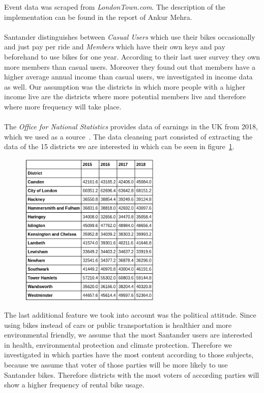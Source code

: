 Event data was scraped from \emph{LondonTown.com}\cite{LondonTown2019}. The description of the implementation can be found in the report of Ankur Mehra.\\\\
Santander distinguishes between \emph{Casual Users} which use their bikes occasionally and just pay per ride and \emph{Members} which have their own keys and pay beforehand to use bikes for one year. According to their last user survey they own more members than casual users. Moreover they found out that members have a higher average annual income than casual users, we investigated in income data as well. Our assumption was the districts in which more people with a higher income live are the districts where more potential members live and therefore where more frequency will take place.\\\\
The \emph{Office for National Statistics} provides data of earnings in the UK from 2018, which we used as a source~\cite{OfficeforNationalStatistics2019}. The data cleansing part consisted of extracting the data of the 15 districts we are interested in which can be seen in figure~\ref{fig:earnings}.
\begin{figure}[H]
\centering
\includegraphics[width=0.6\textwidth]{img/earnings}\label{fig:earnings}
\label{fig:earnings}
\end{figure}
The last additional feature we took into account was the political attitude. Since using bikes instead of cars or public transportation is healthier and more environmental friendly, we assume that the most Santander users are interested in health, environmental protection and climate protection. Therefore we investigated in which parties have the most content according to those subjects, because we assume that voter of those parties will be more likely to use Santander bikes. Therefore districts with the most voters of according parties will show a higher frequency of rental bike usage.\\\\
